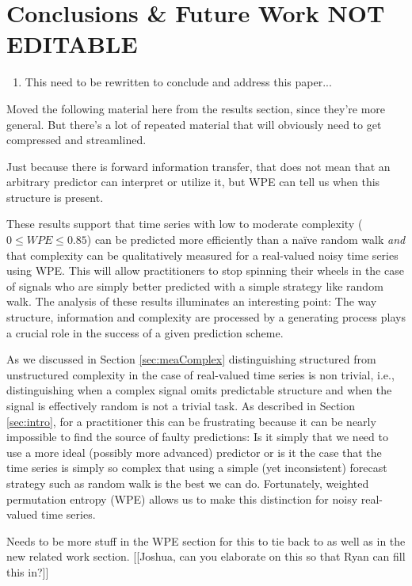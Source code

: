 \section{ Conclusions \& Future Work {\color{red} NOT EDITABLE}}\label{sec:conc}

\begin{enumerate}
\item  This need to be rewritten to conclude and address this paper...
\end{enumerate}

Moved the following material here from the results section, since
they're more general.  But there's a lot of repeated material that
will obviously need to get compressed and streamlined.

Just because there is forward information transfer, that does not mean
that an arbitrary predictor can interpret or utilize it, but WPE can
tell us when this structure is present.

These results support that time series with low to moderate complexity
($0\le WPE \le 0.85$) can be predicted more efficiently than a na\"ive
random walk \emph{and} that complexity can be qualitatively measured
for a real-valued noisy time series using WPE. This will allow
practitioners to stop spinning their wheels in the case of signals who
are simply better predicted with a simple strategy like random
walk. The analysis of these results illuminates an interesting point:
The way structure, information and complexity are processed by a
generating process plays a crucial role in the success of a given
prediction scheme.

As we discussed in Section \ref{sec:meaComplex} distinguishing
structured from unstructured complexity in the case of real-valued
time series is non trivial, i.e., distinguishing when a complex signal
omits predictable structure and when the signal is effectively random
is not a trivial task. As described in Section \ref{sec:intro}, for a
practitioner this can be frustrating because it can be nearly
impossible to find the source of faulty predictions: Is it simply that
we need to use a more ideal (possibly more advanced) predictor or is
it the case that the time series is simply so complex that using a
simple (yet inconsistent) forecast strategy such as random walk is the
best we can do. Fortunately, weighted permutation entropy (WPE) allows
us to make this distinction for noisy real-valued time series.

Needs to be more stuff in the WPE section for this to tie back to as
well as in the new related work section.  [[Joshua, can you elaborate
    on this so that Ryan can fill this in?]]

